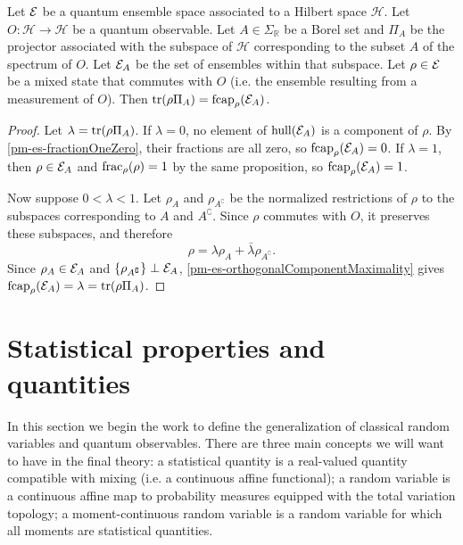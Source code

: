 \begin{mathSection}
	\begin{prop}
		Let $\mathcal{E}$ be a quantum ensemble space associated to a Hilbert space $\mathcal{H}$. Let $O : \mathcal{H} \to \mathcal{H}$ be a quantum observable. Let $A \in \Sigma_{\mathbb{R}}$ be a Borel set and $\Pi_{A}$ be the projector associated with the subspace of $\mathcal{H}$ corresponding to the subset $A$ of the spectrum of $O$. Let $\mathcal{E}_A$ be the set of ensembles within that subspace. Let $\rho \in \mathcal{E}$ be a mixed state that commutes with $O$ (i.e. the ensemble resulting from a measurement of $O$). Then $\operatorname{tr}(\rho \Pi_A) = \mathrm{fcap}_{\rho}(\mathcal{E}_A)$.
	\end{prop}
\begin{proof}
	Let $\lambda=\operatorname{tr}(\rho \Pi_A)$. If $\lambda=0$, no element of $\mathrm{hull}(\mathcal{E}_A)$ is a component of $\rho$. By \ref{pm-es-fractionOneZero}, their fractions are all zero, so $\mathrm{fcap}_\rho(\mathcal{E}_A)=0$. If $\lambda=1$, then $\rho \in \mathcal{E}_A$ and $\mathrm{frac}_\rho(\rho)=1$ by the same proposition, so $\mathrm{fcap}_\rho(\mathcal{E}_A)=1$.
	
	Now suppose $0<\lambda<1$. Let $\rho_A$ and $\rho_{A^{\complement}}$ be the normalized restrictions of $\rho$ to the subspaces corresponding to $A$ and $A^{\complement}$. Since $\rho$ commutes with $O$, it preserves these subspaces, and therefore
	\begin{equation}
		\rho=\lambda\rho_A+\bar{\lambda}\rho_{A^{\complement}}.
	\end{equation}
	Since $\rho_A \in \mathcal{E}_A$ and $\{\rho_{A^{\complement}}\} \perp \mathcal{E}_A$, \ref{pm-es-orthogonalComponentMaximality} gives $\mathrm{fcap}_\rho(\mathcal{E}_A)=\lambda=\operatorname{tr}(\rho \Pi_A)$.
\end{proof}
\end{mathSection}

\section{Statistical properties and quantities}

In this section we begin the work to define the generalization of classical random variables and quantum observables. There are three main concepts we will want to have in the final theory: a statistical quantity is a real-valued quantity compatible with mixing (i.e. a continuous affine functional); a random variable is a continuous affine map to probability measures equipped with the total variation topology; a moment-continuous random variable is a random variable for which all moments are statistical quantities.

